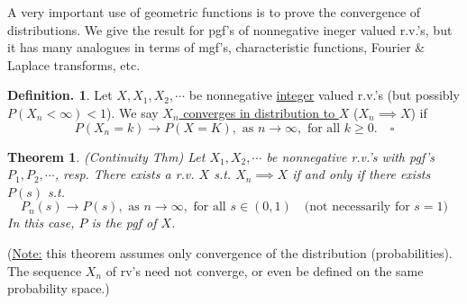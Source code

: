 \documentclass[12pt]{article}
\theoremstyle{definition}
\newtheorem{mydef}{Definition.}[section]
\theoremstyle{plain}
\newtheorem{mythm}{Theorem}[section]
\begin{document}
A very important use of geometric functions is to prove the convergence of distributions. We give the result for pgf's of nonnegative ineger valued r.v.'s, but it has many analogues in terms of mgf's, characteristic functions, Fourier \& Laplace transforms, etc.
\begin{mydef}
Let $X, X_1, X_2, \cdots$ be nonnegative \underline{integer} valued r.v.'s (but possibly $P(X_n < \infty) < 1$). We say \underline{$X_n$ converges in distribution to $X$} ($X_n \implies X$) if \[P(X_n = k) \rightarrow P(X = K), \mbox{ as } n \rightarrow \infty, \mbox{ for all } k \geq 0. \quad \square \]
\end{mydef}
\begin{mythm}
(Continuity Thm) Let $X_1, X_2, \cdots$ be nonnegative r.v.'s with pgf's $P_1, P_2, \cdots$, resp. There exists a r.v. $X$ s.t. $X_n \implies X$ if and only if there exists $P(s)$ s.t. \[P_n(s) \rightarrow P(s), \mbox{ as } n \rightarrow \infty, \mbox{ for all } s \in (0,1) \quad \mbox{(not necessarily for $s =1$)}\] In this case, $P$ is the pgf of $X$.
\end{mythm}
(\underline{\underline{Note:}} this theorem assumes only convergence of the distribution (probabilities). The sequence $X_n$ of rv's need not converge, or even be defined on the same probability space.)
\end{document}
